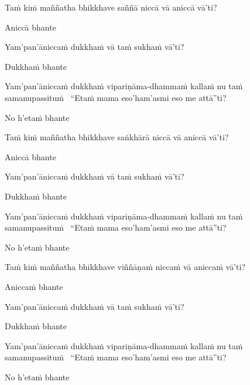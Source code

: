 \begin{pali-hang}
  Taṁ kiṁ maññatha bhikkhave saññā niccā vā aniccā vā'ti?
\end{pali-hang}
\begin{pali-hang-together}
  Aniccā bhante
\end{pali-hang-together}
\begin{pali-hang-together}
  Yam'pan'āniccaṁ dukkhaṁ vā taṁ sukhaṁ vā'ti?
\end{pali-hang-together}
\begin{pali-hang-together}
  Dukkhaṁ bhante
\end{pali-hang-together}
\ifninebythirteen\clearpage\fi
\begin{pali-hang-together}
  Yam'pan'āniccaṁ dukkhaṁ vipariṇāma-dhammaṁ kallaṁ nu taṁ samanupassituṁ \breathmark\ ``Etaṁ mama eso'ham'asmi eso me attā''ti?
\end{pali-hang-together}
\begin{pali-hang-together}
  No h'etaṁ bhante
\end{pali-hang-together}

\begin{pali-hang}
  Taṁ kiṁ maññatha bhikkhave saṅkhārā niccā vā aniccā vā'ti?
\end{pali-hang}
\begin{pali-hang-together}
  Aniccā bhante
\end{pali-hang-together}
\begin{pali-hang-together}
  Yam'pan'āniccaṁ dukkhaṁ vā taṁ sukhaṁ vā'ti?
\end{pali-hang-together}
\begin{pali-hang-together}
  Dukkhaṁ bhante
\end{pali-hang-together}
\begin{pali-hang-together}
  Yam'pan'āniccaṁ dukkhaṁ vipariṇāma-dhammaṁ kallaṁ nu taṁ samanupassituṁ \breathmark\ ``Etaṁ mama eso'ham'asmi eso me attā''ti?
\end{pali-hang-together}
\begin{pali-hang-together}
  No h'etaṁ bhante
\end{pali-hang-together}

\begin{pali-hang}
  Taṁ kiṁ maññatha bhikkhave viññāṇaṁ niccaṁ vā aniccaṁ vā'ti?
\end{pali-hang}
\begin{pali-hang-together}
  Aniccaṁ bhante
\end{pali-hang-together}
\begin{pali-hang-together}
  Yam'pan'āniccaṁ dukkhaṁ vā taṁ sukhaṁ vā'ti?
\end{pali-hang-together}
\begin{pali-hang-together}
  Dukkhaṁ bhante
\end{pali-hang-together}
\begin{pali-hang-together}
  Yam'pan'āniccaṁ dukkhaṁ vipariṇāma-dhammaṁ kallaṁ nu taṁ samanupassituṁ \breathmark\ ``Etaṁ mama eso'ham'asmi eso me attā''ti?
\end{pali-hang-together}
\begin{pali-hang-together}
  No h'etaṁ bhante
\end{pali-hang-together}

